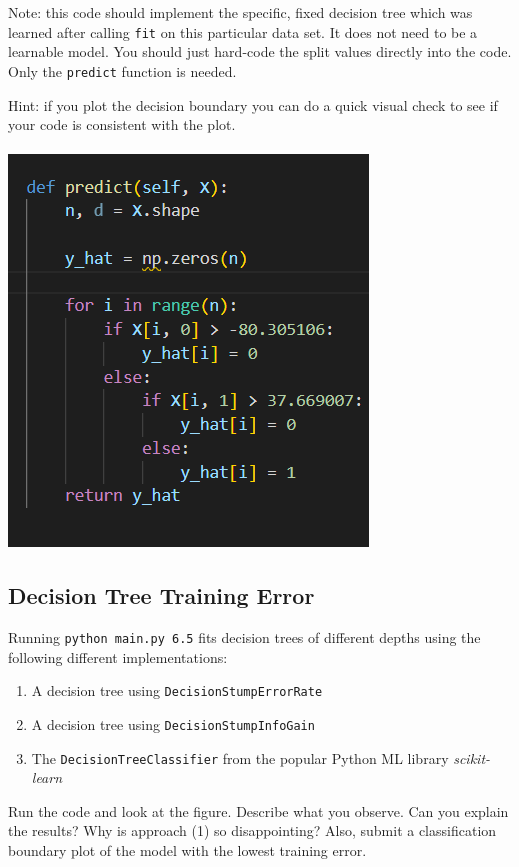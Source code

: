 \documentclass{article}
\def\blu#1{{\color{blu}#1}}
\begin{document}
  Note: this code should implement the specific, fixed decision tree
  which was learned after calling \texttt{fit} on this particular data set. It does not need to be a learnable model.
  You should just hard-code the split values directly into the code.
  Only the \texttt{predict} function is needed.

  Hint: if you plot the decision boundary you can do a quick visual check to see if your code is consistent with the plot.
  \\\\
  \includegraphics{6_4}
  \clearpage

  \subsection{Decision Tree Training Error}

  Running \texttt{python main.py 6.5} fits decision trees of different depths using the following different implementations:
  \begin{enumerate}
  \item A decision tree using \texttt{DecisionStumpErrorRate}
  \item A decision tree using \texttt{DecisionStumpInfoGain}
  \item The \texttt{DecisionTreeClassifier} from the popular Python ML library \emph{scikit-learn}
  \end{enumerate}

  Run the code and look at the figure.
  \blu{Describe what you observe. Can you explain the results?} Why is approach (1) so disappointing? Also, \blu{submit a classification boundary plot of the model with the lowest training error}.
\end{document}
